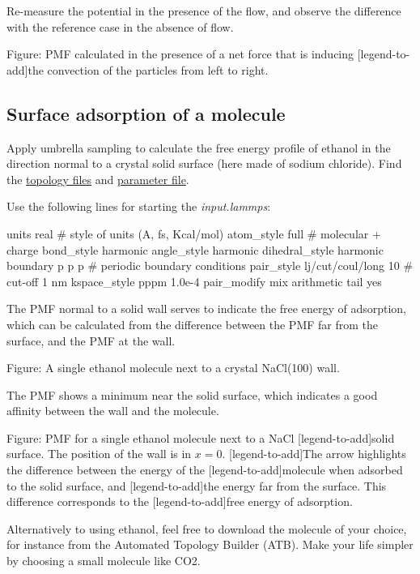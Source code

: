 \vspace{0.25cm} \noindent Re-measure the potential in the presence of the flow, and observe the difference
with the reference case in the absence of flow.

\vspace{0.25cm} Figure: PMF calculated in the presence of a net force that is inducing
[legend-to-add]the convection of the particles from left to right. 

\subsection{Surface adsorption of a molecule}
\noindent Apply umbrella sampling to calculate the free energy profile
of ethanol in the direction normal to a crystal solid surface
(here made of sodium chloride). Find the \href{https://lammpstutorials.github.io/lammpstutorials-inputs/level3/free-energy-calculation/Exercises/MoleculeAdsorption/init.data}{topology files}
and \href{https://lammpstutorials.github.io/lammpstutorials-inputs/level3/free-energy-calculation/Exercises/MoleculeAdsorption/PARM.lammps}{parameter file}.

\vspace{0.25cm} \noindent Use the following lines for starting the \textit{input.lammps}:

\begin{lcverbatim}
units real # style of units (A, fs, Kcal/mol)
atom_style full # molecular + charge
bond_style harmonic
angle_style harmonic
dihedral_style harmonic
boundary p p p # periodic boundary conditions
pair_style lj/cut/coul/long 10 # cut-off 1 nm
kspace_style pppm 1.0e-4
pair_modify mix arithmetic tail yes
\end{lcverbatim}

\noindent The PMF normal to a solid wall serves to indicate the free energy of adsorption,
which can be calculated from the difference between the PMF far
from the surface, and the PMF at the wall.

\vspace{0.25cm} Figure: A single ethanol molecule next to a crystal NaCl(100) wall.

\vspace{0.25cm} \noindent The PMF shows a minimum near the solid surface, which indicates a good
affinity between the wall and the molecule.

\vspace{0.25cm} Figure: PMF for a single ethanol molecule next to a NaCl
[legend-to-add]solid surface. The position of the wall is in $x=0$.
[legend-to-add]The arrow highlights the difference between the energy of the 
[legend-to-add]molecule when adsorbed to the solid surface, and
[legend-to-add]the energy far from the surface. This difference corresponds to the
[legend-to-add]free energy of adsorption.

\vspace{0.25cm} \noindent Alternatively to using ethanol, feel free to download the molecule of your choice, for 
instance from the Automated Topology Builder (ATB). Make your life simpler
by choosing a small molecule like CO2.

